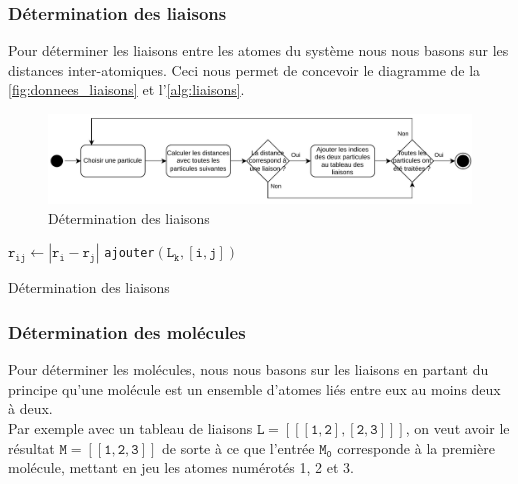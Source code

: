 \documentclass[11pt, a4paper]{article}
\begin{document}
		\subsubsection{Détermination des liaisons}

Pour déterminer les liaisons entre les atomes du système nous nous basons sur les distances inter-atomiques. Ceci nous permet de concevoir le diagramme de la \autoref{fig:donnees_liaisons} et l'\autoref{alg:liaisons}.

\begin{figure}[hpbt]
	\centering
	\includegraphics[width=\linewidth]{donnees-liaisons.pdf}
	\caption{Détermination des liaisons}
	\label{fig:donnees_liaisons}
\end{figure}

\begin{algorithm}[htpb]
	\Deb%
	{
		{
			{
				$\mathtt{r_{ij} \gets |r_i - r_j|}$\;
				{
					{
						\texttt{ajouter}$\mathtt{(L_k, [i, j])}$\;
					}
				}
			}
		}
	}
	\caption{Détermination des liaisons}
	\label{alg:liaisons}
\end{algorithm}

		\subsubsection{Détermination des molécules}

Pour déterminer les molécules, nous nous basons sur les liaisons en partant du principe qu'une molécule est un ensemble d'atomes liés entre eux au moins deux à deux.\\
Par exemple avec un tableau de liaisons $\mathtt{L = [[[1, 2], [2, 3]]]}$, on veut avoir le résultat $\mathtt{M = [[1, 2, 3]]}$ de sorte à ce que l'entrée $\mathtt{M_0}$ corresponde à la première molécule, mettant en jeu les atomes numérotés \num{1}, \num{2} et \num{3}.
\end{document}
